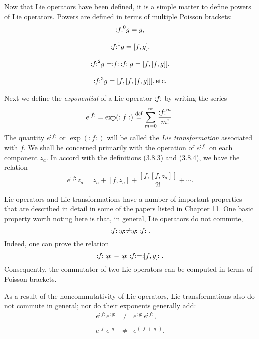      Now that Lie operators have been defined, it is a simple matter to
define powers of Lie operators.  Powers are defined in terms of multiple
Poisson brackets:
\begin{equation}
\begin{array}{c}
           {\Lieop(f)}^0 g = g,\\
                         \\
           {\Lieop(f)}^1 g = [f,g],\\
                             \\
           {\Lieop(f)}^2 g = \Lieop(f)\:\Lieop(f)g = [f,[f,g]],\\
                                           \\
           {\Lieop(f)}^3 g = [f,[f,[f,g]]], {\rm etc.}\\
\end{array}
\end{equation}

     Next we define the {\em exponential} of a Lie operator $\Lieop(f)$ by writing the
series
\begin{equation}
       e^{:f:} = \exp (:f:) \stackrel{\rm def}{=} \sum_{m=0}^{\infty} \frac{{\Lieop(f)}^m}{m!}.
\end{equation}
The quantity $e^{:f:}$ or $\exp (:f:)$ will be called the {\em Lie transformation } associated with
$f$.  We shall be concerned primarily with the operation of $e^{:f:}$ on each
component $z_a$.  In accord with the definitions (3.8.3) and (3.8.4), we have
the relation
\begin{equation}
      e^{:f:} z_a = z_a + [f,z_a] + \frac{[f,[f,z_a]]}{2!} + \cdots.
\end{equation}

     Lie operators and Lie transformations have a number of important
properties that are described in detail in some of the papers listed
in Chapter 11.  One basic property worth noting here is that, in
general, Lie operators do not commute,
\begin{equation}
      \Lieop(f)\:\Lieop(g) \neq \Lieop(g)\:\Lieop(f).
\end{equation}
Indeed, one can prove the relation
\begin{equation}
      \Lieop(f)\:\Lieop(g) - \Lieop(g)\:\Lieop(f) = \Lieop([f,g]).
\end{equation}
Consequently, the commutator of two Lie operators can be computed in terms
of Poisson brackets.

     As a result of the noncommutativity of Lie operators, Lie
transformations also do not commute in general; nor do their exponents
generally add:
\begin{equation}
\begin{array}{lll}
                  e^{:f:} e^{:g:} & \neq & e^{:g:} e^{:f:},\\
                                  &      &                 \\
                  e^{:f:} e^{:g:} & \neq & e^{(:f: + :g:)}.
\end{array}
\end{equation}

